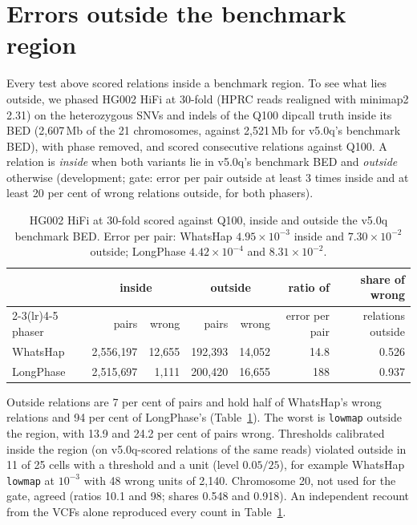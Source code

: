 \documentclass[11pt]{article}
\theoremstyle{definition}
\theoremstyle{remark}
\begin{document}
\section{Errors outside the benchmark region}\label{sec:outside}

Every test above scored relations inside a benchmark region. To see what
lies outside, we phased HG002 HiFi at 30-fold (HPRC reads realigned with
minimap2 2.31) on the heterozygous SNVs and indels of the Q100 dipcall truth
inside its BED (2{,}607\,Mb of the 21 chromosomes, against 2{,}521\,Mb for
v5.0q's benchmark BED), with phase removed, and scored consecutive relations
against Q100. A relation is \emph{inside} when both variants lie in v5.0q's
benchmark BED and \emph{outside} otherwise (development; gate: error per
pair outside at least 3 times inside and at least 20 per cent of wrong
relations outside, for both phasers).

\begin{table}[t]
\centering\footnotesize
\begin{tabular}{@{}lrrrrrr@{}}
\toprule
 & \multicolumn{2}{c}{inside} & \multicolumn{2}{c}{outside} & ratio of & share of wrong\\
\cmidrule(lr){2-3}\cmidrule(lr){4-5}
phaser & pairs & wrong & pairs & wrong & error per pair & relations outside\\
\midrule
WhatsHap & 2{,}556{,}197 & 12{,}655 & 192{,}393 & 14{,}052 & 14.8 & 0.526\\
LongPhase & 2{,}515{,}697 & 1{,}111 & 200{,}420 & 16{,}655 & 188 & 0.937\\
\bottomrule
\end{tabular}
\caption{HG002 HiFi at 30-fold scored against Q100, inside and outside the
v5.0q benchmark BED. Error per pair: WhatsHap $4.95\times10^{-3}$ inside and
$7.30\times10^{-2}$ outside; LongPhase $4.42\times10^{-4}$ and
$8.31\times10^{-2}$.}
\label{tab:outside}
\end{table}

Outside relations are 7 per cent of pairs and hold half of WhatsHap's wrong
relations and 94 per cent of LongPhase's (Table~\ref{tab:outside}). The worst
is \texttt{lowmap} outside the region, with 13.9 and 24.2 per cent of pairs
wrong. Thresholds calibrated inside the region (on v5.0q-scored relations
of the same reads) violated outside in 11 of 25 cells with a threshold and
a unit (level $0.05/25$), for example WhatsHap \texttt{lowmap} at $10^{-3}$
with 48 wrong units of 2{,}140. Chromosome 20, not used for the gate, agreed
(ratios 10.1 and 98; shares 0.548 and 0.918). An independent recount from
the VCFs alone reproduced every count in Table~\ref{tab:outside}.
\end{document}
